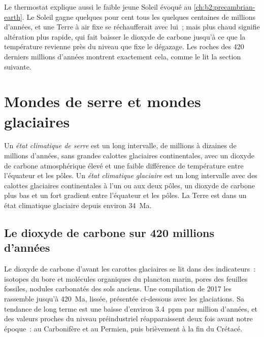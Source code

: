 Le thermostat explique aussi le faible jeune Soleil évoqué au \cref{ch:b2:precambrian-earth}. Le Soleil gagne
quelques pour cent tous les quelques centaines de millions d'années, et une Terre à air fixe se réchaufferait avec lui~;
mais plus chaud signifie altération plus rapide, qui fait baisser le dioxyde de carbone jusqu'à ce que la température
revienne près du niveau que fixe le dégazage. Les roches des 420 derniers millions d'années montrent exactement cela,
comme le lit la section suivante.

\section{Mondes de serre et mondes glaciaires}\label{sec:b2:deep-time-climate:states}

\begin{definition}\label{def:b2:deep-time-climate:states}
Un \emph{état climatique de serre} est un long intervalle, de millions à
dizaines de millions d'années, sans grandes calottes glaciaires continentales, avec un dioxyde de carbone atmosphérique
élevé et une faible différence de température entre l'équateur et les pôles. Un \emph{état climatique
glaciaire} est un long intervalle avec des calottes glaciaires continentales à l'un
ou aux deux pôles, un dioxyde de carbone plus bas et un fort gradient entre l'équateur et les pôles. La Terre est dans un
état climatique glaciaire depuis environ \qty{34}{Ma}.
\end{definition}

\subsection*{Le dioxyde de carbone sur 420 millions d'années}

Le dioxyde de carbone d'avant les carottes glaciaires se lit dans des indicateurs~: isotopes du bore et molécules
organiques du plancton marin, pores des feuilles fossiles, nodules carbonatés des sols anciens. Une compilation de 2017
les rassemble jusqu'à \qty{420}{Ma}, lissée, présentée ci-dessous avec les glaciations. Sa tendance
de long terme est une baisse d'environ \qty{3.4}{ppm} par million d'années, et des valeurs proches du niveau
préindustriel réapparaissent deux fois avant notre époque~: au Carbonifère et au Permien, puis
brièvement à la fin du Crétacé.

